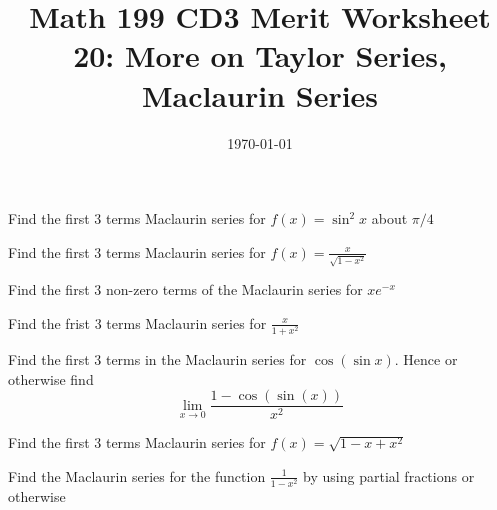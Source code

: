 
\usepackage{fullpage,amsmath,amssymb,amsthm}

\newcommand{\D}{\displaystyle}

\title{Math 199 CD3 Merit Worksheet 20: More on Taylor Series, Maclaurin Series}
\date{\today}




\maketitle

\be
	\item Find the first 3 terms Maclaurin series for $f(x)= \sin^2 x$ about $\pi/4$

	\vfill

	\item Find the first 3 terms Maclaurin series for $f(x)=\frac{x}{\sqrt{1-x^2}}$

	\vfill

	\item Find the first 3 non-zero terms of the Maclaurin series for $xe^{- x}$

	\vfill
	\item Find the frist 3 terms Maclaurin series for $\frac{x}{1+x^2}$
	\vfill
	\newpage
	\item Find the first 3 terms in the Maclaurin series for $\cos(\sin x)$. Hence or otherwise find 
	$$\lim_{x \to 0}\frac{1-\cos(\sin (x))}{x^2}$$
	\vfill

	\item Find the first 3 terms Maclaurin series for $f(x)=\sqrt{1-x+x^2}$
	\vfill

	\item Find the Maclaurin series for the function $\frac{1}{1-x^2}$ by using partial fractions or otherwise
	\vfill
\ee

